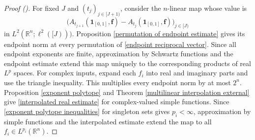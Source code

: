 \documentclass[12pt,reqno]{amsart}
\newcommand{\auto}{{({\tiny\faCar})}}
\theoremstyle{plain}
\numberwithin{equation}{section}
\theoremstyle{remark}
\newcommand{\R}{{\mathbb R}}
\begin{document}
\begin{proof}[Proof \auto]
For fixed $J$ and $(t_j)_{j\in[J+1)}$, consider the $n$-linear map whose value is
\[
\big(A_{t_{j+1}}(\mathbf1_{[0,1]},\mathbf f)-A_{t_j}(\mathbf1_{[0,1]},\mathbf f)\big)_{j\in[J)}
\]
in $L^2(\R^n;\ell^2([J)))$. Proposition \ref{permutation of endpoint estimate} gives its endpoint norm at every permutation of \eqref{endpoint reciprocal vector}. Since all endpoint exponents are finite, approximation by Schwartz functions and the endpoint estimate extend this map uniquely to the corresponding products of real $L^p$ spaces. For complex inputs, expand each $f_i$ into real and imaginary parts and use the triangle inequality. This multiplies every endpoint norm by at most $2^n$. Proposition \ref{exponent polytope} and Theorem \ref{multilinear interpolation external} give \eqref{interpolated real estimate} for complex-valued simple functions. Since \eqref{exponent polytope inequalities} for singleton sets gives $p_i<\infty$, approximation by simple functions and the interpolated estimate extend the map to all $f_i\in L^{p_i}(\R^n)$.
\end{proof}
\end{document}
